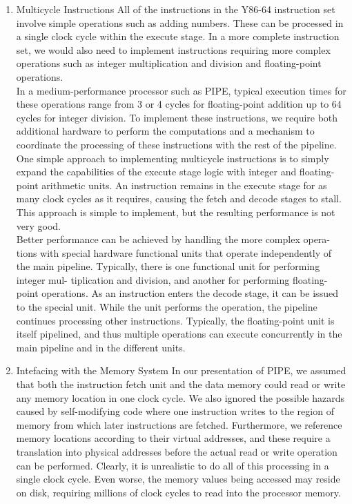 \documentclass[11pt]{article}
\begin{document}
\begin{enumerate}
\item Multicycle Instructions
\label{sec:org5e3155b}
All of the instructions in the Y86-64 instruction set involve simple operations such as adding numbers. These can be processed in a single clock cycle within the execute stage. In a more complete instruction set, we would also need to implement instructions requiring more complex operations such as integer multiplication and division and floating-point operations.\\

In a medium-performance processor such as PIPE, typical execution times for these operations range from 3 or 4 cycles for floating-point addition up to 64 cycles for integer division. To implement these instructions, we require both additional hardware to perform the computations and a mechanism to coordinate the processing of these instructions with the rest of the pipeline.\\

One simple approach to implementing multicycle instructions is to simply expand the capabilities of the execute stage logic with integer and floating-point arithmetic units. An instruction remains in the execute stage for as many clock cycles as it requires, causing the fetch and decode stages to stall. This approach is simple to implement, but the resulting performance is not very good.\\

Better performance can be achieved by handling the more complex opera- tions with special hardware functional units that operate independently of the main pipeline. Typically, there is one functional unit for performing integer mul- tiplication and division, and another for performing floating-point operations. As an instruction enters the decode stage, it can be issued to the special unit. While the unit performs the operation, the pipeline continues processing other instructions. Typically, the floating-point unit is itself pipelined, and thus multiple operations can execute concurrently in the main pipeline and in the different units.\\

\item Intefacing with the Memory System
\label{sec:orgdc128a0}
In our presentation of PIPE, we assumed that both the instruction fetch unit and the data memory could read or write any memory location in one clock cycle. We also ignored the possible hazards caused by self-modifying code where one instruction writes to the region of memory from which later instructions are fetched. Furthermore, we reference memory locations according to their virtual addresses, and these require a translation into physical addresses before the actual read or write operation can be performed. Clearly, it is unrealistic to do all of this processing in a single clock cycle. Even worse, the memory values being accessed may reside on disk, requiring millions of clock cycles to read into the processor memory.\\


\end{enumerate}
\end{document}
